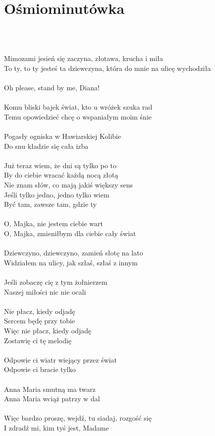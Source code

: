 \documentclass[a5paper, 10pt]{book}
\begin{document}
\newpage
\section{Ośmiominutówka}\textcolor{lightgray}{\textit{}}\\~\\
\begin{minipage}[t]{0.82\textwidth}
Mimozami jesień się zaczyna, złotawa, krucha i miła\\
To ty, to ty jesteś ta dziewczyna, która do mnie na ulicę wychodziła\\
\\
Oh please, stand by me, Diana!\\
\\
Komu bliski bajek świat, kto u wróżek szuka rad\\
Temu opowiedzieć chcę o wspaniałym moim śnie\\
\\
Pogasły ogniska w Hawiarskiej Kolibie\\
Do snu kładzie się cała izba\\
\\
Już teraz wiem, że dni są tylko po to\\
By do ciebie wracać każdą nocą złotą\\
Nie znam słów, co mają jakiś większy sens\\
Jeśli tylko jedno, jedno tylko wiem\\
Być tam, zawsze tam, gdzie ty\\
\\
O, Majka, nie jestem ciebie wart\\
O, Majka, zmieniłbym dla ciebie cały świat\\
\\
Dziewczyno, dziewczyno, zamień słotę na lato\\
Widziałem na ulicy, jak szłaś, szłaś z innym\\
\\
Jeśli zobaczę cię z tym żołnierzem\\
Naszej miłości nic nie ocali\\
\\
Nie płacz, kiedy odjadę\\
Sercem będę przy tobie\\
Więc nie płacz, kiedy odjadę\\
Zostawię ci tę melodię\\
\\
Odpowie ci wiatr wiejący przez świat\\
Odpowie ci bracie tylko\\
\\
Anna Maria smutną ma twarz\\
Anna Maria wciąż patrzy w dal\\
\\
Więc bardzo proszę, wejdź, tu siadaj, rozgość się\\
I zdradź mi, kim tyś jest, Madame\\

\end{minipage}
\end{document}
